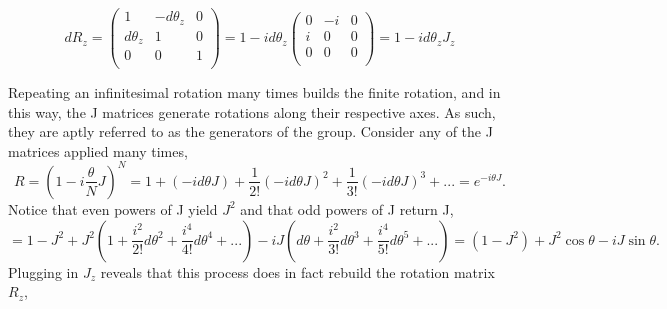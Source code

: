 \begin{equation}
dR_z = 
\begin{pmatrix}
1 & -d\theta_z & 0 \\
d\theta_z & 1 & 0 \\
0 & 0 & 1 \\
\end{pmatrix}
= 1 - id\theta_z 
\begin{pmatrix}
0 & -i & 0 \\
i & 0 & 0 \\
0 & 0 & 0 \\
\end{pmatrix}
= 1 - id\theta_z J_z
\end{equation}

Repeating an infinitesimal rotation many times builds the finite rotation, and in this way, the J matrices generate rotations along their respective axes.  As such, they are aptly referred to as the generators of the group. Consider any of the J matrices applied many times,
\begin{equation}
R = (1 - i\frac{\theta}{N} J)^{N} = 1 + (-id\theta J) + \frac{1}{2!}(-id\theta J)^2 + \frac{1}{3!}(-id\theta J)^3 + ... = e^{-i\theta J}. 
\end{equation}
Notice that even powers of J yield $J^2$ and that odd powers of J return J,
\begin{equation}
  = 1 - J^2 + J^2(1 + \frac{i^2}{2!} d\theta^2 + \frac{i^4}{4!} d\theta^4 + ...) - iJ(d\theta + \frac{i^2}{3!}d\theta^3 + \frac{i^4}{5!}d\theta^5 + ...) 
  = (1-J^2) + J^2 \cos\theta - iJ\sin\theta.
\end{equation}
Plugging in $J_z$ reveals that this process does in fact rebuild the rotation matrix $R_z$,
